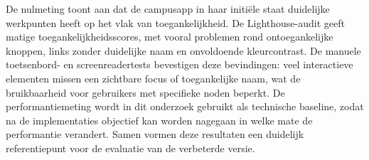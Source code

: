 De nulmeting toont aan dat de campusapp in haar initiële staat duidelijke werkpunten heeft op het vlak van toegankelijkheid. De Lighthouse-audit geeft matige toegankelijkheidsscores, met vooral problemen rond ontoegankelijke knoppen, links zonder duidelijke naam en onvoldoende kleurcontrast. De manuele toetsenbord- en screenreadertests bevestigen deze bevindingen: veel interactieve elementen missen een zichtbare focus of toegankelijke naam, wat de bruikbaarheid voor gebruikers met specifieke noden beperkt. De performantiemeting wordt in dit onderzoek gebruikt als technische baseline, zodat na de implementaties objectief kan worden nagegaan in welke mate de performantie verandert. Samen vormen deze resultaten een duidelijk referentiepunt voor de evaluatie van de verbeterde versie.